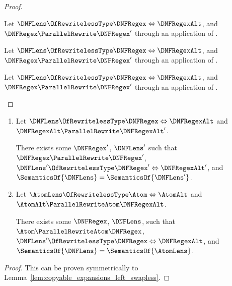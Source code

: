 \documentclass[acmsmall,screen]{acmart}
\begin{document}
\begin{proof}
  
  \begin{case}[\DNFReorderRule{}]
    Let $\DNFLens \OfRewritelessType \DNFRegex \Leftrightarrow \DNFRegexAlt$, and
    $\DNFRegex\ParallelRewrite\DNFRegex'$ through an application of
    \DNFReorderRule{}.
  \end{case}

  \begin{case}[\ParallelDNFStructuralRewriteRule{}]
    Let $\DNFLens \OfRewritelessType \DNFRegex \Leftrightarrow \DNFRegexAlt$, and
    $\DNFRegex\ParallelRewrite\DNFRegex'$ through an application of
    \ParallelDNFStructuralRewriteRule{}.
  \end{case}

  \begin{case}[\IdentityRewriteRule{}]
    Let $\DNFLens \OfRewritelessType \DNFRegex \Leftrightarrow \DNFRegexAlt$, and
    $\DNFRegex\ParallelRewrite\DNFRegex'$ through an application of
    \IdentityRewriteRule{}.
  \end{case}
\end{proof}

\begin{mylemma}
  \label{lem:copyable_expansions_right_swapless}\leavevmode
  \begin{enumerate}
  \item Let $\DNFLens \OfRewritelessType \DNFRegex \Leftrightarrow
    \DNFRegexAlt$ and $\DNFRegexAlt \ParallelRewrite \DNFRegexAlt'$.

    There exists some
    $\DNFRegex'$, $\DNFLens'$ such that $\DNFRegex \ParallelRewrite
    \DNFRegex'$,
    $\DNFLens' \OfRewritelessType
    \DNFRegex' \Leftrightarrow \DNFRegexAlt'$, and $\SemanticsOf{\DNFLens} =
    \SemanticsOf{\DNFLens'}$.
  \item Let $\AtomLens \OfRewritelessType \Atom \Leftrightarrow \AtomAlt$ and
    $\AtomAlt \ParallelRewriteAtom \DNFRegexAlt$.

    There exists some $\DNFRegex$,
    $\DNFLens$, such that $\Atom \ParallelRewriteAtom \DNFRegex$,
    $\DNFLens' \OfRewritelessType \DNFRegex
    \Leftrightarrow \DNFRegexAlt$, and $\SemanticsOf{\DNFLens} =
    \SemanticsOf{\AtomLens}$.
  \end{enumerate}
\end{mylemma}
\begin{proof}
  This can be proven symmetrically to Lemma~\ref{lem:copyable_expansions_left_swapless}.
\end{proof}
\end{document}
